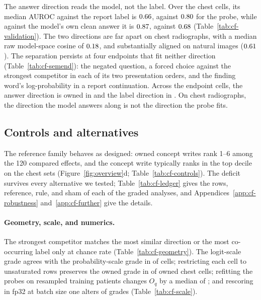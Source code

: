 \documentclass{article}
\begin{document}
The answer direction reads the model, not the label. Over the \cfValAurocAnsChestN{} chest cells, its median AUROC against the report label is $0.66$, against $0.80$ for the probe, while against the model's own clean answer it is $0.87$, against $0.68$ (Table~\ref{tab:cf-validation}). The two directions are far apart on chest radiographs, with a median raw model-space cosine of $0.18$, and substantially aligned on natural images ($0.61$). The separation persists at four endpoints that fit neither direction (Table~\ref{tab:cf-semend}): the negated question, a forced choice against the strongest competitor in each of its two presentation orders, and the finding word's log-probability in a report continuation. Across the \cfSemCells{} endpoint cells, the answer direction is owned in \cfSemAnswerOwned{} and the label direction in \cfSemLabelOwned{}. On chest radiographs, the direction the model answers along is not the direction the probe fits.

\subsection{Controls and alternatives}
\label{sec:controls}

The reference family behaves as designed: owned concept writes rank 1--6 among the 120 compared effects, and the concept write typically ranks in the top decile on the chest sets (Figure~\ref{fig:overview}d; Table~\ref{tab:cf-controls}). The deficit survives every alternative we tested; Table~\ref{tab:cf-ledger} gives the rows, reference, rule, and sham of each of the \cfLedgerAnalyses{} graded analyses, and Appendices~\ref{app:cf-robustness} and~\ref{app:cf-further} give the details.
\label{sec:robust-geometry}

\paragraph{Geometry, scale, and numerics.} The strongest competitor matches the most similar direction or the most co-occurring label only at chance rate (Table~\ref{tab:cf-geometry}). The logit-scale grade agrees with the probability-scale grade in \cfScaleAgree{} of \cfScaleAgreeN{} cells; restricting each cell to unsaturated rows preserves the owned grade in \cfScaleUnsatGradeKept{} of \cfScaleUnsatGradeN{} owned chest cells; refitting the probes on resampled training patients changes $O_q$ by a median of \cfScaleRefitMedian{}; and rescoring in fp32 at batch size one alters \cfPrecisionGradeChanges{} of \cfPrecisionGradeCells{} grades (Table~\ref{tab:cf-scale}).
\end{document}

